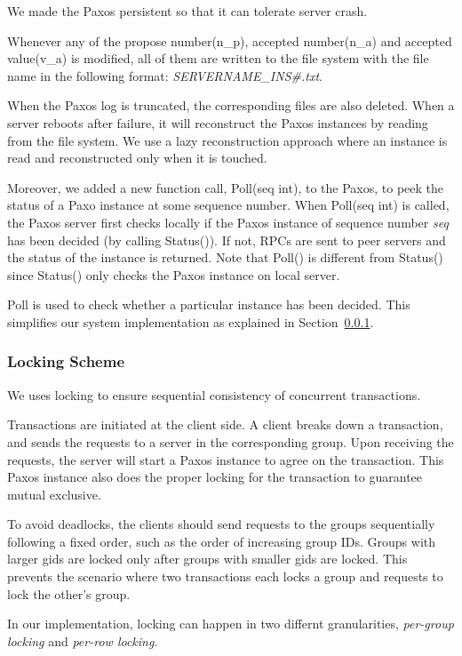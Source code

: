 \documentclass{vldb}
\begin{document}
We made the Paxos persistent so that it can tolerate server crash.

Whenever any of the propose number(n\_p), accepted number(n\_a) and 
accepted value(v\_a) is modified, all of them are written to the file 
system with the file name in the following format: 
\textit{SERVERNAME\_INS\#.txt}.

When the Paxos log is truncated, the corresponding files are also 
deleted. When a server reboots after failure, it will reconstruct the 
Paxos instances by reading from the file system. We use a lazy 
reconstruction approach where an instance is read and reconstructed 
only when it is touched.

Moreover, we added a new function call, Poll(seq int), to the Paxos, 
to peek the status of a Paxo instance at some sequence number. When 
Poll(seq int) is called, the Paxos server first checks locally if the 
Paxos instance of sequence number \textit{seq} has been decided (by 
calling Status()). If not, RPCs are sent to peer servers and the 
status of the instance is returned. Note that Poll() is different
from Status() since Status() only checks the Paxos instance on local 
server.

Poll is used to check whether a particular instance has been decided.  
This simplifies our system implementation as explained in 
Section~\ref{sec:lock}.


\subsubsection{Locking Scheme}
\label{sec:lock}

We uses locking to ensure sequential consistency of concurrent 
transactions.

Transactions are initiated at the client side. A client breaks down a 
transaction, and sends the requests to a server in the corresponding 
group. Upon receiving the requests, the server will start a Paxos 
instance to agree on the transaction. This Paxos instance also does 
the proper locking for the transaction to guarantee mutual exclusive.

To avoid deadlocks, the clients should send requests to the groups 
sequentially following a fixed order, such as the order of increasing 
group IDs. Groups with larger gids are locked only after groups with 
smaller gids are locked. This prevents the scenario where two 
transactions each locks a group and requests to lock the other's 
group.

In our implementation, locking can happen in two differnt 
granularities, \textit{per-group locking} and \textit{per-row 
locking}. 
\end{document}
